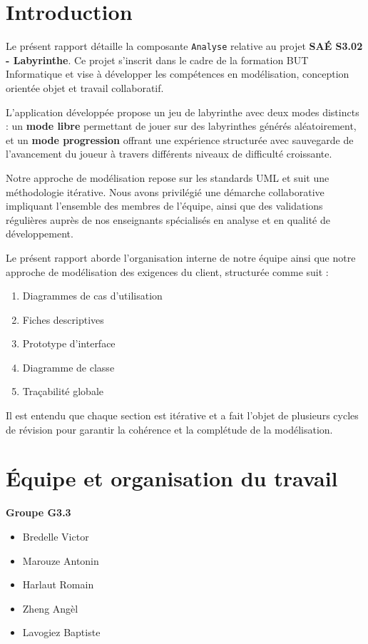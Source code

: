 \documentclass{butexFR}
\begin{document}
\fairepagedegarde
\fairemarges
\tabledematieres



\section{Introduction}

Le présent rapport détaille la composante \texttt{Analyse} relative au projet \textbf{SAÉ S3.02 - Labyrinthe}. Ce projet s'inscrit dans le cadre de la formation BUT Informatique et vise à développer les compétences en modélisation, conception orientée objet et travail collaboratif.

L'application développée propose un jeu de labyrinthe avec deux modes distincts : un \textbf{mode libre} permettant de jouer sur des labyrinthes générés aléatoirement, et un \textbf{mode progression} offrant une expérience structurée avec sauvegarde de l'avancement du joueur à travers différents niveaux de difficulté croissante.

Notre approche de modélisation repose sur les standards UML et suit une méthodologie itérative. Nous avons privilégié une démarche collaborative impliquant l'ensemble des membres de l'équipe, ainsi que des validations régulières auprès de nos enseignants spécialisés en analyse et en qualité de développement.

Le présent rapport aborde l'organisation interne de notre équipe ainsi que notre approche de modélisation des exigences du client, structurée comme suit :

\begin{enumerate}
    \item Diagrammes de cas d'utilisation
    \item Fiches descriptives
    \item Prototype d'interface
    \item Diagramme de classe
    \item Traçabilité globale
\end{enumerate}

Il est entendu que chaque section est itérative et a fait l'objet de plusieurs cycles de révision pour garantir la cohérence et la complétude de la modélisation.

\section{Équipe et organisation du travail}
\textbf{Groupe G3.3}

\begin{itemize}
    \item Bredelle Victor
    \item Marouze Antonin
    \item Harlaut Romain
    \item Zheng Angèl
    \item Lavogiez Baptiste
\end{itemize}
\end{document}
